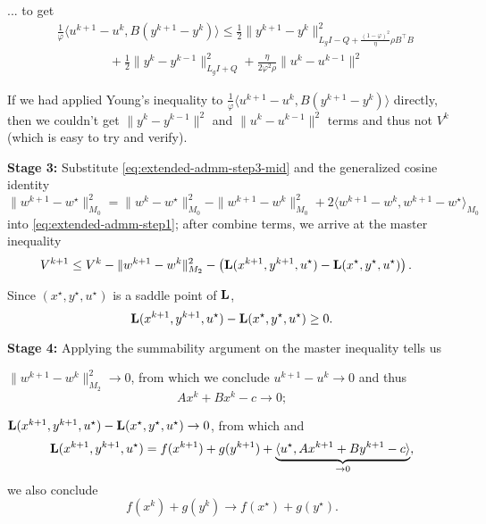 \documentclass[10pt,mathserif]{beamer}
\begin{document}
\begin{frame}
... to get
\begin{align}
&\frac{1}{\varphi}\langle u^{k+1}-u^k,B(y^{k+1}-y^k)\rangle\le
\frac{1}{2}\|y^{k+1}-y^k\|_{L_gI-Q+\frac{(1-\varphi)^2}{\eta}\rho B^\intercal  B}^2 \label{eq:extended-admm-step3-mid}\\
&\hspace{50pt}+\frac{1}{2}\|y^k-y^{k-1}\|^2_{L_gI+Q}
+\frac{\eta}{2\varphi^2\rho}\|u^k-u^{k-1}\|^2
\nonumber
\end{align}  
\medskip

If we had applied Young's inequality to $\frac{1}{\varphi}\langle u^{k+1}-u^k,B(y^{k+1}-y^k)\rangle$ directly, then we couldn't get $\|y^{k}-y^{k-1}\|^2$ and $\|u^{k}-u^{k-1}\|^2$ terms and thus not $V^k$ (which is easy to try and verify).
\end{frame}

\begin{frame}
\textbf{Stage 3:} Substitute \eqref{eq:extended-admm-step3-mid} and the generalized cosine identity
\[
\|w^{k+1}-w^\star\|^2_{M_0}=
\|w^{k}-w^\star\|^2_{M_0}-
\|w^{k+1}-w^{k}\|^2_{M_0}
+
2\langle w^{k+1}-w^k,w^{k+1}-w^\star\rangle_{M_0}
\]
into \eqref{eq:extended-admm-step1}; after combine terms, we arrive at the master inequality
\begin{align*}
V^{k+1}&\le V^k
-\|w^{k+1}-w^k\|^2_{M_2}-\left(\mathbf{L}(x^{k+1},y^{k+1},u^\star)-\mathbf{L}(x^\star,y^\star,u^\star)\right).
\end{align*}
\medskip

Since $(x^\star,y^\star,u^\star)$ is a saddle point of $\mathbf{L}$, 
  \[
\mathbf{L}(x^{k+1},y^{k+1},u^\star)-\mathbf{L}(x^\star,y^\star,u^\star)\ge 0.
\]
\end{frame}

\begin{frame}
\textbf{Stage 4:} Applying the summability argument on the master inequality tells us
\begin{witemize}
\item $\|w^{k+1}-w^k\|^2_{M_2}\rightarrow 0$, from which we conclude $u^{k+1}-u^k\rightarrow 0$ and thus \[ Ax^k+Bx^k-c\rightarrow 0;\]
\item $\mathbf{L}(x^{k+1},y^{k+1},u^\star)-\mathbf{L}(x^\star,y^\star,u^\star)\rightarrow 0$, from which and
\[
\mathbf{L}(x^{k+1},y^{k+1},u^\star)=
f(x^{k+1})+g(y^{k+1})+
\underbrace{\langle u^\star,Ax^{k+1}+By^{k+1}-c\rangle}_{\rightarrow 0},
\]
we also conclude \[f(x^{k})+g(y^{k})\rightarrow f(x^{\star})+g(y^{\star}).\]
\end{witemize}
\end{frame}
\end{document}
